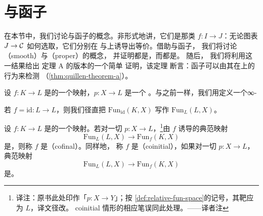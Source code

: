 \section{\trCofinal{}与\trCoinitial{}函子}
\label{sec:cofinal-coinitial-functors}

在本节中，我们讨论\trCofinal{}与\trCoinitial{}函子的概念。非形式地讲，它们是那类%
\trFunctor{} $f\colon I \to J$：无论图表 $J \to \mathcal{C}$ 如何选取，它们分别在%
\trColimit{}与\trLimit{}上诱导出等价。借助\trCofinal{}与\trCoinitial{}函子，
我们将讨论\trSmooth{}（smooth）与\trProper{}（proper）\trFunctor{}的概念，
并证明\trLeftFibration{}都是\trSmooth{}，而\trRightFibration{}都是\trProper{}。
随后，
我们将利用这一结果给出 \trQuillen{}定理 A 的\trInfinityCategory{}版本的一个简单
证明，该定理
断言：\trCofinal{}函子可以由其在\trSliceCategory{}上的行为来检测
（\cref{thm:quillen-theorem-a}）。

\begin{definition}\label{def:relative-fun-space}
设 $f\colon K \to L$ 是\trSimplicialSets{}的一个映射，$p\colon X \to L$ 是一个%
\trInnerFibration{}。与之前一样，我们用\trPullback{}定义一个∞-\trCategory{}%
\begin{center}
\end{center}
若 $f = \mathrm{id}\colon L \to L$，则我们径直把 $\mathrm{Fun}_{\mathrm{id}}(K, X)$
写作 $\mathrm{Fun}_L(L, X)$。
\end{definition}

\begin{definition}\label{def:cofinal-coinitial}
设 $f\colon K \to L$ 是\trSimplicialSets{}的一个映射。若对一切\trRightFibration{}%
$p\colon X \to L$，\footnote{译注：原书此处印作「$p\colon X \to Y$」；按%
\cref{def:relative-fun-space}的记号，其靶应为 $L$，译文径改。
coinitial 情形的相应笔误同此处理。——译者注}由 $f$ 诱导的典范映射
\[
\mathrm{Fun}_L(L, X) \longrightarrow \mathrm{Fun}_f(K, X)
\]
是\trJoyalEquivalence{}，则称 $f$ 是\emph{\trCofinal{}}（cofinal）。同样地，
称 $f$ 是\emph{\trCoinitial{}}（coinitial），如果对一切\trLeftFibration{}%
$p\colon X \to L$，典范映射
\[
\mathrm{Fun}_L(L, X) \longrightarrow \mathrm{Fun}_f(K, X)
\]
是\trJoyalEquivalence{}。
\end{definition}

